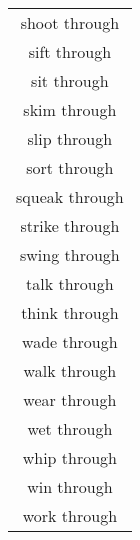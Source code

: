 \begin{longtable}{c}
shoot through \\
sift through \\
sit through \\
skim through \\
slip through \\
sort through \\
squeak through \\
strike through \\
swing through \\
talk through \\
think through \\
wade through \\
walk through \\
wear through \\
wet through \\
whip through \\
win through \\
work through \\
\bottomrule
\midrule
\end{longtable}
